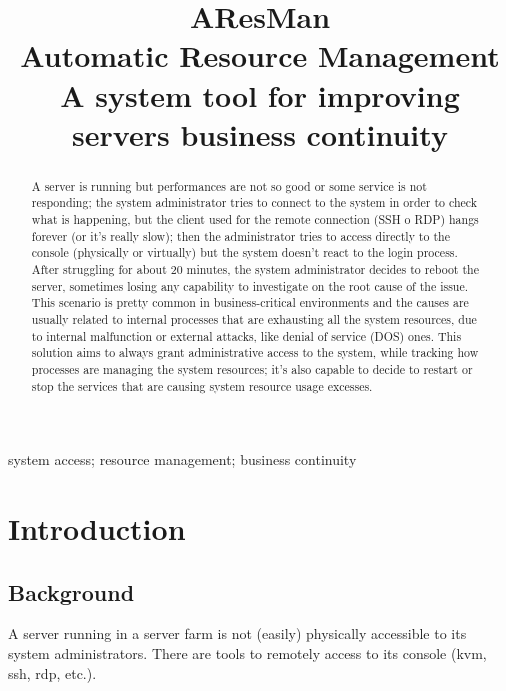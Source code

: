 \documentclass[conference]{IEEEtran}
\begin{document}
\title{AResMan\\
Automatic Resource Management\\
{\footnotesize A system tool for improving servers business continuity}
}

\author{
}

\maketitle

\begin{abstract}
A server is running but performances are not so good or some service is not responding; the system administrator tries to connect to the system in order to check what is happening, but the client used for the remote connection (SSH o RDP) hangs forever (or it’s really slow); then the administrator tries to access directly to the console (physically or virtually) but the system doesn’t react to the login process. After struggling for about 20 minutes, the system administrator decides to reboot the server, sometimes losing any capability to investigate on the root cause of the issue. 
This scenario is pretty common in business-critical environments and the causes are usually related to internal processes that are exhausting all the system resources, due to internal malfunction or external attacks, like denial of service (DOS) ones. 
This solution aims to always grant administrative access to the system, while tracking how processes are managing the system resources; it’s also capable to decide to restart or stop the services that are causing system resource usage excesses. 
\end{abstract}

\begin{IEEEkeywords}
system access; resource management; business continuity
\end{IEEEkeywords}

\section{Introduction}
\subsection{Background}
A server running in a server farm is not (easily) physically accessible to its system administrators. There are tools to remotely access to its console (kvm, ssh, rdp, etc.). 
\end{document}
